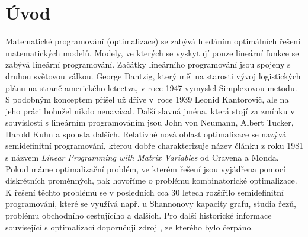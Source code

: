 \chapter*{Úvod}

Matematické programování (optimalizace) se zabývá hledáním optimálních řešení matematických modelů. Modely, ve kterých se vyskytují pouze lineární funkce se zabývá lineární programování. Začátky lineárního programování jsou spojeny s druhou světovou válkou. George Dantzig, který měl na starosti vývoj logistických plánu na straně amerického letectva, v roce 1947 vymyslel Simplexovou metodu. S podobným konceptem přišel už dříve v~roce 1939 Leonid Kantorovič, ale na jeho práci bohužel nikdo nenavázal. Další slavná jména, která stojí za zmínku v souvislosti s lineárním programováním jsou John von Neumann, Albert Tucker, Harold Kuhn a spousta dalších. Relativně nová oblast optimalizace se nazývá semidefinitní programování, kterou dobře charakterizuje název článku z roku 1981 s názvem \textit{Linear Programming with Matrix Variables} od Cravena a Monda. Pokud máme optimalizační problém, ve kterém řešení jsou vyjádřena pomocí diskrétních proměnných, pak hovoříme o problému kombinatorické optimalizace. K řešení těchto problémů se v posledních cca 30 letech rozšířilo semidefinitní programování, které se využívá např. u Shannonovy kapacity grafu, studia řezů, problému obchodního cestujícího a dalších. Pro další historické informace související s optimalizací doporučuji zdroj \cite{history}, ze kterého bylo čerpáno.